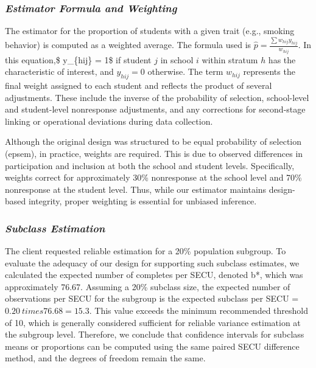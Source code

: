 \documentclass[
  12pt]{article}
\begin{document}
\subsubsection{\texorpdfstring{\emph{Estimator Formula and
Weighting}}{Estimator Formula and Weighting}}\label{estimator-formula-and-weighting}

The estimator for the proportion of students with a given trait (e.g.,
smoking behavior) is computed as a weighted average. The formula used is
\(\hat{p} = \frac{\sum w_{hij} y_{hij}}{w_{hij}}\). In this equation,\$
y\_\{hij\} = 1\$ if student \(j\) in school \(i\) within stratum \(h\)
has the characteristic of interest, and \(y_{hij} = 0\) otherwise. The
term \(w_{hij}\) represents the final weight assigned to each student
and reflects the product of several adjustments. These include the
inverse of the probability of selection, school-level and student-level
nonresponse adjustments, and any corrections for second-stage linking or
operational deviations during data collection.

Although the original design was structured to be equal probability of
selection (epsem), in practice, weights are required. This is due to
observed differences in participation and inclusion at both the school
and student levels. Specifically, weights correct for approximately 30\%
nonresponse at the school level and 70\% nonresponse at the student
level. Thus, while our estimator maintains design-based integrity,
proper weighting is essential for unbiased inference.

\subsubsection{\texorpdfstring{\emph{Subclass
Estimation}}{Subclass Estimation}}\label{subclass-estimation}

The client requested reliable estimation for a 20\% population subgroup.
To evaluate the adequacy of our design for supporting such subclass
estimates, we calculated the expected number of completes per SECU,
denoted b*, which was approximately 76.67. Assuming a 20\% subclass
size, the expected number of observations per SECU for the subgroup is
the expected subclass per SECU = \(0.20 \ times 76.68 = 15.3\). This
value exceeds the minimum recommended threshold of 10, which is
generally considered sufficient for reliable variance estimation at the
subgroup level. Therefore, we conclude that confidence intervals for
subclass means or proportions can be computed using the same paired SECU
difference method, and the degrees of freedom remain the same.
\end{document}
